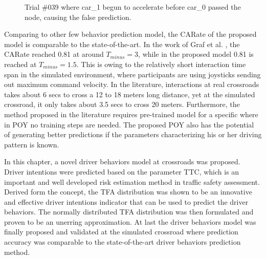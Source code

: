 \begin{figure}[htbp!]
\begin{center}
\end{center}
\caption{Trial \#039 where car\_1 begun to accelerate before car\_0 passed the node, causing the false prediction.}
\label{fig:trial039} 
\end{figure}

Comparing to other few behavior prediction model, the CARate of the proposed model is comparable to the state-of-the-art. In the work of Graf et al. \cite{Graf2014}, the CARate reached 0.81 at around $T_{minus} = 3$, while in the proposed model 0.81 is reached at $T_{minus} = 1.5$. This is owing to the relatively short interaction time span in the simulated environment, where participants are using joysticks sending out maximum command velocity. In the literature, interactions at real crossroads takes about 6 secs to cross a 12 to 18 meters long distance, yet at the simulated crossroad, it only takes about 3.5 secs to cross 20 meters. Furthermore, the method proposed in the literature requires pre-trained model for a specific where in POY no training steps are needed. The proposed POY also has the potential of generating better predictions if the parameters characterizing his or her driving pattern is known.


In this chapter, a novel driver behaviors model at crossroads was proposed. Driver intentions were predicted based on the parameter TTC, which is an important and well developed risk estimation method in traffic safety assessment. Derived form the concept, the TFA distribution was shown to be an innovative and effective driver intentions indicator that can be used to predict the driver behaviors. The normally distributed TFA distribution was then formulated and proven to be an unerring approximation. At last the driver behaviors model was finally proposed and validated at the simulated crossroad where prediction accuracy was comparable to the state-of-the-art driver behaviors prediction method. 